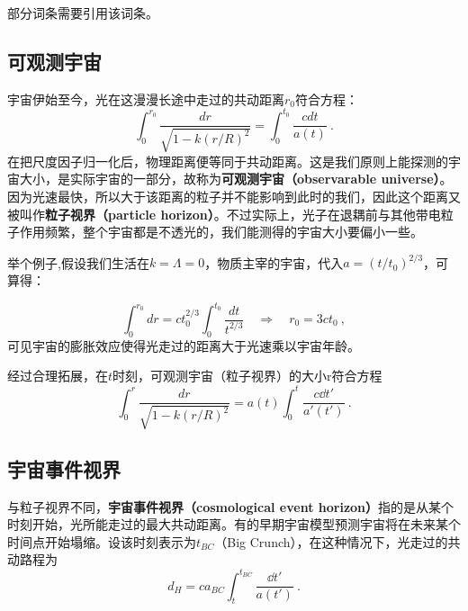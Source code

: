 
\begin{issues}
\issueTODO
部分词条需要引用该词条。
\end{issues}

\subsection{可观测宇宙}
宇宙伊始至今，光在这漫漫长途中走过的共动距离$r_0$符合方程：
\begin{equation}
\int_{0}^{r_{0}} \frac{d r}{\sqrt{1-k (r/R)^{2}}}=\int_{0}^{t_{0}} \frac{c d t}{a(t)}~.
\end{equation}
在把尺度因子归一化后，物理距离便等同于共动距离。这是我们原则上能探测的宇宙大小，是实际宇宙的一部分，故称为\textbf{可观测宇宙（observarable universe）}。因为光速最快，所以大于该距离的粒子并不能影响到此时的我们，因此这个距离又被叫作\textbf{粒子视界（particle horizon）}。不过实际上，光子在退耦前与其他带电粒子作用频繁，整个宇宙都是不透光的，我们能测得的宇宙大小要偏小一些。

举个例子,假设我们生活在$k=\Lambda=0$，物质主宰的宇宙，代入$a=(t/t_0)^{2/3}$，可算得：

\begin{equation}\int_0^{r_0}dr=ct_0^{2/3}\int_0^{t_0}\frac{dt}{t^{2/3}}\quad\Longrightarrow\quad r_0=3ct_0 ~,\end{equation}
可见宇宙的膨胀效应使得光走过的距离大于光速乘以宇宙年龄。

经过合理拓展，在$t$时刻，可观测宇宙（粒子视界）的大小r符合方程
\begin{equation}
\int_{0}^{r} \frac{d r}{\sqrt{1-k (r/R)^{2}}}=a(t)\int_{0}^{t} \frac{c \dd t'}{a'(t')}~.
\end{equation}

\subsection{宇宙事件视界}
与粒子视界不同，\textbf{宇宙事件视界（cosmological event horizon）}指的是从某个时刻开始，光所能走过的最大共动距离。有的早期宇宙模型预测宇宙将在未来某个时间点开始塌缩。设该时刻表示为$t_{BC}$（Big Crunch），在这种情况下，光走过的共动路程为
\begin{equation}
d_H=ca_{BC}\int^{t_{BC}}_{t}\frac{\dd t'}{a(t')}~.
\end{equation}
